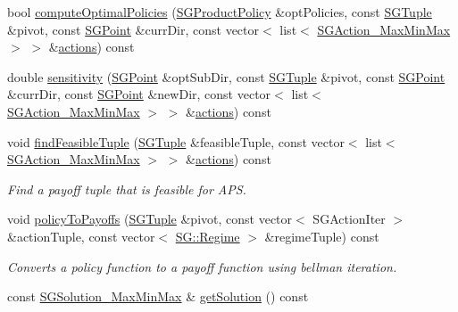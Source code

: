 \begin{DoxyCompactItemize}
bool \hyperlink{classSGSolver__MaxMinMax__3Player_ac4a619fc0fb7048614b82cf3c7acad15}{compute\+Optimal\+Policies} (\hyperlink{classSGProductPolicy}{S\+G\+Product\+Policy} \&opt\+Policies, const \hyperlink{classSGTuple}{S\+G\+Tuple} \&pivot, const \hyperlink{classSGPoint}{S\+G\+Point} \&curr\+Dir, const vector$<$ list$<$ \hyperlink{classSGAction__MaxMinMax}{S\+G\+Action\+\_\+\+Max\+Min\+Max} $>$ $>$ \&\hyperlink{classSGSolver__MaxMinMax__3Player_ace3cdb3d3a60e9c43d0a23e8d716080a}{actions}) const
\item 
double \hyperlink{classSGSolver__MaxMinMax__3Player_ae7a03c10161b8e5616b648465d039f6c}{sensitivity} (\hyperlink{classSGPoint}{S\+G\+Point} \&opt\+Sub\+Dir, const \hyperlink{classSGTuple}{S\+G\+Tuple} \&pivot, const \hyperlink{classSGPoint}{S\+G\+Point} \&curr\+Dir, const \hyperlink{classSGPoint}{S\+G\+Point} \&new\+Dir, const vector$<$ list$<$ \hyperlink{classSGAction__MaxMinMax}{S\+G\+Action\+\_\+\+Max\+Min\+Max} $>$ $>$ \&\hyperlink{classSGSolver__MaxMinMax__3Player_ace3cdb3d3a60e9c43d0a23e8d716080a}{actions}) const
\item 
\mbox{\label{classSGSolver__MaxMinMax__3Player_af0feb25b8fb48283f800b963f6c68726}} 
void \hyperlink{classSGSolver__MaxMinMax__3Player_af0feb25b8fb48283f800b963f6c68726}{find\+Feasible\+Tuple} (\hyperlink{classSGTuple}{S\+G\+Tuple} \&feasible\+Tuple, const vector$<$ list$<$ \hyperlink{classSGAction__MaxMinMax}{S\+G\+Action\+\_\+\+Max\+Min\+Max} $>$ $>$ \&\hyperlink{classSGSolver__MaxMinMax__3Player_ace3cdb3d3a60e9c43d0a23e8d716080a}{actions}) const
\begin{DoxyCompactList}\small\item\em Find a payoff tuple that is feasible for A\+PS. \end{DoxyCompactList}\item 
\mbox{\label{classSGSolver__MaxMinMax__3Player_a9a56a59a0296bd73d3cf7db585aedcf9}} 
void \hyperlink{classSGSolver__MaxMinMax__3Player_a9a56a59a0296bd73d3cf7db585aedcf9}{policy\+To\+Payoffs} (\hyperlink{classSGTuple}{S\+G\+Tuple} \&pivot, const vector$<$ S\+G\+Action\+Iter $>$ \&action\+Tuple, const vector$<$ \hyperlink{namespaceSG_a139e4dec41ea0f38aae1f93f60cfff60}{S\+G\+::\+Regime} $>$ \&regime\+Tuple) const
\begin{DoxyCompactList}\small\item\em Converts a policy function to a payoff function using bellman iteration. \end{DoxyCompactList}\item 
const \hyperlink{classSGSolution__MaxMinMax}{S\+G\+Solution\+\_\+\+Max\+Min\+Max} \& \hyperlink{classSGSolver__MaxMinMax__3Player_a749f42db5eedf73787c1beba3ac97c85}{get\+Solution} () const
\end{DoxyCompactItemize}
